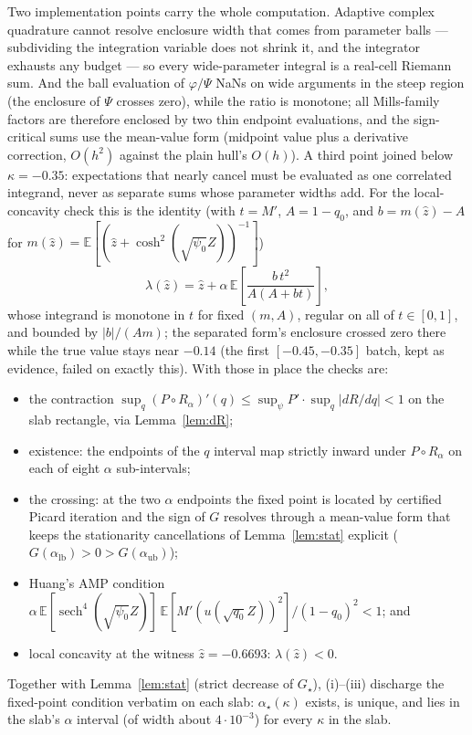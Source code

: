 \documentclass[11pt]{article}
\theoremstyle{remark}
\newcommand{\E}{\mathbb{E}}
\DeclareMathOperator{\sech}{sech}
\begin{document}
Two implementation points carry the whole computation.  Adaptive
complex quadrature cannot resolve enclosure width that comes from
parameter balls --- subdividing the integration variable does not
shrink it, and the integrator exhausts any budget --- so every
wide-parameter integral is a real-cell Riemann sum.  And the ball
evaluation of $\varphi/\Psi$ NaNs on wide arguments in the steep
region (the enclosure of $\Psi$ crosses zero), while the ratio is
monotone; all Mills-family factors are therefore enclosed by two thin
endpoint evaluations, and the sign-critical sums use the mean-value
form (midpoint value plus a derivative correction, $O(h^2)$ against
the plain hull's $O(h)$).  A third point joined below
$\kappa=-0.35$: expectations that nearly cancel must be evaluated as
one correlated integrand, never as separate sums whose parameter
widths add.  For the local-concavity check this is the identity
(with $t=M'$, $A=1-q_0$, and $b=m(\hat z)-A$ for
$m(\hat z)=\E[(\hat z+\cosh^2(\sqrt{\psi_0}Z))^{-1}]$)
\[
\lambda(\hat z)=\hat z+\alpha\,\E\!\left[\frac{b\,t^2}{A(A+bt)}\right],
\]
whose integrand is monotone in $t$ for fixed $(m,A)$, regular on all
of $t\in[0,1]$, and bounded by $|b|/(Am)$; the separated form's
enclosure crossed zero there while the true value stays near $-0.14$
(the first $[-0.45,-0.35]$ batch, kept as evidence, failed on exactly
this).  With those in place the checks are:

\begin{itemize}
\item[(i)] the contraction
$\sup_q(P\circ R_\alpha)'(q)\le
\sup_\psi P'\cdot\sup_q|dR/dq|<1$ on the slab rectangle, via
Lemma~\ref{lem:dR};
\item[(ii)] existence: the endpoints of the $q$ interval map strictly
inward under $P\circ R_\alpha$ on each of eight $\alpha$
sub-intervals;
\item[(iii)] the crossing: at the two $\alpha$ endpoints the fixed
point is located by certified Picard iteration and the sign of $G$
resolves through a mean-value form that keeps the stationarity
cancellations of Lemma~\ref{lem:stat} explicit
($G(\alpha_{\mathrm{lb}})>0>G(\alpha_{\mathrm{ub}})$);
\item[(iv)] Huang's AMP condition
$\alpha\,\E[\sech^4(\sqrt{\psi_0}Z)]\,
\E[M'(u(\sqrt{q_0}Z))^2]/(1-q_0)^2<1$; and
\item[(v)] local concavity at the witness $\hat z=-0.6693$:
$\lambda(\hat z)<0$.
\end{itemize}

Together with Lemma~\ref{lem:stat} (strict decrease of $G_\star$),
(i)--(iii) discharge the fixed-point condition verbatim on each slab:
$\alpha_\star(\kappa)$ exists, is unique, and lies in the slab's
$\alpha$ interval (of width about $4\cdot10^{-3}$) for every $\kappa$
in the slab.
\end{document}
